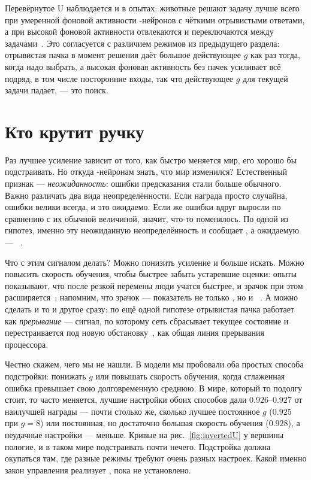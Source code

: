 Перевёрнутое U наблюдается и в опытах: животные решают задачу лучше всего при умеренной фоновой активности -нейронов с чёткими отрывистыми ответами, а при высокой фоновой активности отвлекаются и переключаются между задачами~\cite{AstonJones2005}. Это согласуется с различием режимов из предыдущего раздела: отрывистая пачка в момент решения даёт большое действующее $g$ как раз тогда, когда надо выбрать, а высокая фоновая активность без пачек усиливает всё подряд, в том числе посторонние входы, так что действующее $g$ для текущей задачи падает, --- это поиск.

\section{Кто крутит ручку}

Раз лучшее усиление зависит от того, как быстро меняется мир, его хорошо бы подстраивать. Но откуда -нейронам знать, что мир изменился? Естественный признак --- \emph{неожиданность}: ошибки предсказания стали больше обычного. Важно различать два вида неопределённости. Если награда просто случайна, ошибки велики всегда, и это ожидаемо. Если же ошибки вдруг выросли по сравнению с их обычной величиной, значит, что-то поменялось. По одной из гипотез, именно эту неожиданную неопределённость и сообщает , а ожидаемую --- ~\cite{YuDayan2005}.

Что с этим сигналом делать? Можно понизить усиление и больше искать. Можно повысить скорость обучения, чтобы быстрее забыть устаревшие оценки: опыты показывают, что после резкой перемены люди учатся быстрее, и зрачок при этом расширяется~\cite{Nassar2012}; напомним, что зрачок --- показатель не только , но и ~\cite{Reimer2016}. А можно сделать и то и другое сразу: по ещё одной гипотезе отрывистая пачка  работает как \emph{прерывание} --- сигнал, по которому сеть сбрасывает текущее состояние и перестраивается под новую обстановку~\cite{BouretSara2005}, как общая линия прерывания процессора.

Честно скажем, чего мы не нашли. В модели мы пробовали оба простых способа подстройки: понижать $g$ или повышать скорость обучения, когда сглаженная ошибка превышает свою долговременную среднюю. В мире, который то подолгу стоит, то часто меняется, лучшие настройки обоих способов дали $0.926$--$0.927$ от наилучшей награды --- почти столько же, сколько лучшее постоянное $g$ ($0.925$ при $g=8$) или постоянная, но достаточно большая скорость обучения ($0.928$), а неудачные настройки --- меньше. Кривые на рис.~\ref{fig:invertedU} у вершины пологие, и в таком мире подстраивать почти нечего. Подстройка должна окупаться там, где разные режимы требуют очень разных настроек. Какой именно закон управления реализует , пока не установлено.

